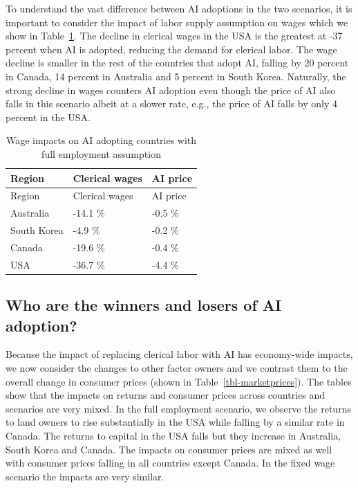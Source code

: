 \documentclass[
  authoryear,
  doubleblind]{elsarticle}
\begin{document}
To understand the vast difference between AI adoptions in the two
scenarios, it is important to consider the impact of labor supply
assumption on wages which we show in Table~\ref{tbl-wages-aiprice}. The
decline in clerical wages in the USA is the greatest at -37 percent when
AI is adopted, reducing the demand for clerical labor. The wage decline
is smaller in the rest of the countries that adopt AI, falling by 20
percent in Canada, 14 percent in Australia and 5 percent in South Korea.
Naturally, the strong decline in wages counters AI adoption even though
the price of AI also falls in this scenario albeit at a slower rate,
e.g., the price of AI falls by only 4 percent in the USA.

\scriptsize

\begin{longtable}[]{@{}lll@{}}
\caption{Wage impacts on AI adopting countries with full employment
assumption}\label{tbl-wages-aiprice}\tabularnewline
\toprule\noalign{}
Region & Clerical wages & AI price \\
\midrule\noalign{}
\endfirsthead
\toprule\noalign{}
Region & Clerical wages & AI price \\
\midrule\noalign{}
\endhead
\bottomrule\noalign{}
\endlastfoot
Australia & -14.1 \% & -0.5 \% \\
South Korea & -4.9 \% & -0.2 \% \\
Canada & -19.6 \% & -0.4 \% \\
USA & -36.7 \% & -4.4 \% \\
\end{longtable}

\normalsize

\subsection{Who are the winners and losers of AI
adoption?}\label{who-are-the-winners-and-losers-of-ai-adoption}

Because the impact of replacing clerical labor with AI has economy-wide
impacts, we now consider the changes to other factor owners and we
contrast them to the overall change in consumer prices (shown in
Table~\ref{tbl-marketprices}). The tables show that the impacts on
returns and consumer prices across countries and scenarios are very
mixed. In the full employment scenario, we observe the returns to land
owners to rise substantially in the USA while falling by a similar rate
in Canada. The returns to capital in the USA falls but they increase in
Australia, South Korea and Canada. The impacts on consumer prices are
mixed as well with consumer prices falling in all countries except
Canada. In the fixed wage scenario the impacts are very similar.
\end{document}
